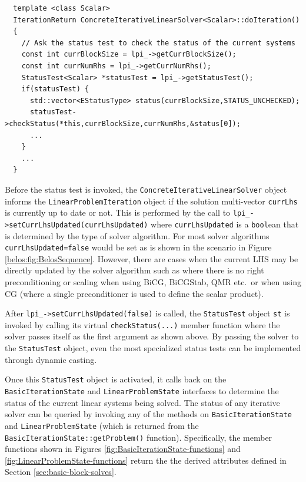 \documentclass[pdf,ps2pdf,11pt]{SANDreport}
\begin{document}
\begin{enumerate}
{\scriptsize\begin{verbatim}
  template <class Scalar>
  IterationReturn ConcreteIterativeLinearSolver<Scalar>::doIteration()
  {
    // Ask the status test to check the status of the current systems
    const int currBlockSize = lpi_->getCurrBlockSize();
    const int currNumRhs = lpi_->getCurrNumRhs();
    StatusTest<Scalar> *statusTest = lpi_->getStatusTest();
    if(statusTest) {
      std::vector<EStatusType> status(currBlockSize,STATUS_UNCHECKED);
      statusTest->checkStatus(*this,currBlockSize,currNumRhs,&status[0]);
      ...
    }
    ...
  }
\end{verbatim}}

Before the status test is invoked, the
{}\texttt{Concrete\-Iterative\-Linear\-Solver} object informs the
{}\texttt{Linear\-Problem\-Iteration} object if the solution
multi-vector {}\texttt{currLhs} is currently up to date or not.  This
is performed by the call to
{}\texttt{lpi\_->\-set\-Curr\-Lhs\-Updated(\-curr\-Lhs\-Updated\-)}
where {}\texttt{curr\-Lhs\-Updated} is a {}\texttt{bool}ean that is
determined by the type of solver algorithm.  For most solver
algorithms {}\texttt{curr\-Lhs\-Updated=false} would be set as is
shown in the scenario in Figure {}\ref{belos:fig:BelosSequence}.
However, there are cases when the current LHS may be directly updated
by the solver algorithm such as where there is no right
preconditioning or scaling when using BiCG, BiCGStab, QMR etc.~or when
using CG (where a single preconditioner is used to define the scalar
product).

After
{}\texttt{lpi\_->\-set\-Curr\-Lhs\-Updated(\-false\-)} is
called, the {}\texttt{Status\-Test} object {}\texttt{st} is invoked by
calling its virtual {}\texttt{checkStatus(...)} member function where
the solver passes itself as the first argument as shown above. By
passing the solver to the {}\texttt{Status\-Test} object, even the
most specialized status tests can be implemented through dynamic
casting.

Once this {}\texttt{Status\-Test} object is activated, it calls back
on the {}\texttt{Basic\-Iteration\-State} and
{}\texttt{Linear\-Problem\-State} interfaces to determine the status
of the current linear systems being solved.  The status of any
iterative solver can be queried by invoking any of the methods on
{}\texttt{Basic\-Iteration\-State} and
{}\texttt{Linear\-Problem\-State} (which is returned from the
{}\texttt{Basic\-Iteration\-State\-::get\-Problem()} function).
Specifically, the member functions shown in Figures
{}\ref{fig:BasicIterationState-functions} and
{}\ref{fig:LinearProblemState-functions} return the the derived
attributes defined in Section {}\ref{sec:basic-block-solves}.


\end{enumerate}
\end{document}

